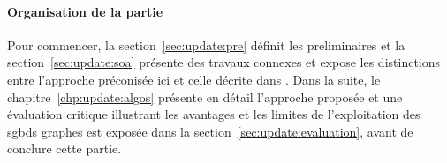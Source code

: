 \paragraph{Organisation de la partie}
Pour commencer, la section~\ref{sec:update:pre} définit les preliminaires et la section~\ref{sec:update:soa} présente des travaux connexes et expose les distinctions entre l'approche préconisée ici et celle décrite dans \cite{chabinConsistentUpdatingDatabases2020}.
Dans la suite, le chapitre~\ref{chp:update:algos} présente en détail l'approche proposée et une évaluation critique illustrant les avantages et les limites de l'exploitation des \glspl{sgbd} graphes est exposée dans la section~\ref{sec:update:evaluation}, avant de conclure cette partie.
